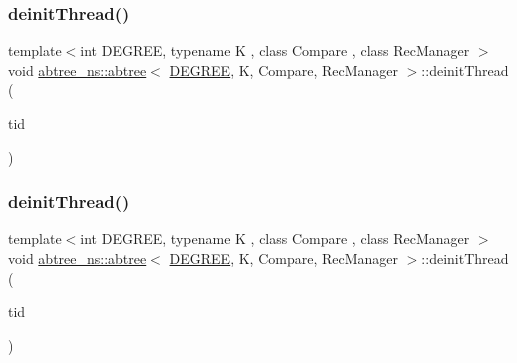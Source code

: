 \subsubsection{\texorpdfstring{deinit\+Thread()}{deinitThread()}\hspace{0.1cm}{\footnotesize\ttfamily [1/2]}}
{\footnotesize\ttfamily template$<$int D\+E\+G\+R\+EE, typename K , class Compare , class Rec\+Manager $>$ \\
void \hyperlink{classabtree__ns_1_1abtree}{abtree\+\_\+ns\+::abtree}$<$ \hyperlink{brown__sigouin__abtree__kcas_2adapter_8h_a5d88b17d70c985f2f2b8e987037fd6dd}{D\+E\+G\+R\+EE}, K, Compare, Rec\+Manager $>$\+::deinit\+Thread (\begin{DoxyParamCaption}\item[{const int}]{tid }\end{DoxyParamCaption})\hspace{0.3cm}{\ttfamily [inline]}}

\mbox{\label{classabtree__ns_1_1abtree_aa88728d950187868d9b97cb65dcb5e83}} 
\subsubsection{\texorpdfstring{deinit\+Thread()}{deinitThread()}\hspace{0.1cm}{\footnotesize\ttfamily [2/2]}}
{\footnotesize\ttfamily template$<$int D\+E\+G\+R\+EE, typename K , class Compare , class Rec\+Manager $>$ \\
void \hyperlink{classabtree__ns_1_1abtree}{abtree\+\_\+ns\+::abtree}$<$ \hyperlink{brown__sigouin__abtree__kcas_2adapter_8h_a5d88b17d70c985f2f2b8e987037fd6dd}{D\+E\+G\+R\+EE}, K, Compare, Rec\+Manager $>$\+::deinit\+Thread (\begin{DoxyParamCaption}\item[{const int}]{tid }\end{DoxyParamCaption})\hspace{0.3cm}{\ttfamily [inline]}}

\mbox{\label{classabtree__ns_1_1abtree_a59a638bd5a3fc2cd53893ec8c80a0970}} 
